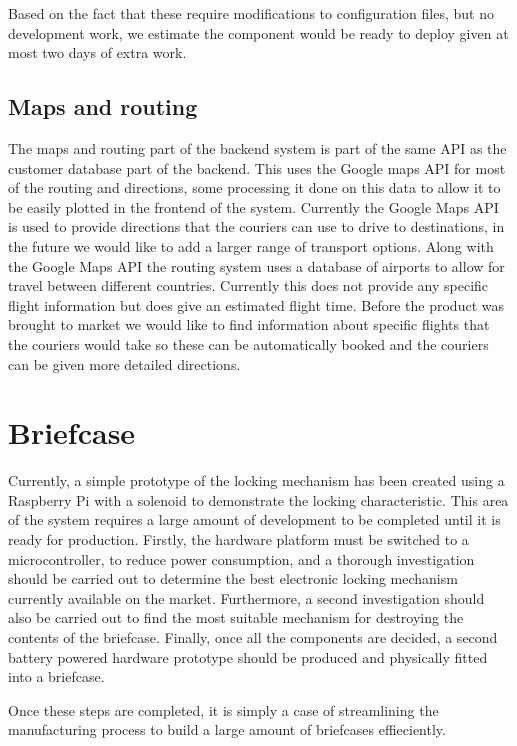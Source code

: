 Based on the fact that these require modifications to configuration files, but no development work, we estimate the component would be ready to deploy given at most two days of extra work.

\subsection{Maps and routing}

The maps and routing part of the backend system is part of the same API as the customer database part of the backend. This uses the Google maps API \cite{MapsAPI} for most of the routing and directions, some processing it done on this data to allow it to be easily plotted in the frontend of the system. Currently the Google Maps API is used to provide directions that the couriers can use to drive to destinations, in the future we would like to add a larger range of transport options. Along with the Google Maps API the routing system uses a database of airports \cite{AirpotFile} to allow for travel between different countries. Currently this does not provide any specific flight information but does give an estimated flight time. Before the product was brought to market we would like to find information about specific flights that the couriers would take so these can be automatically booked and the couriers can be given more detailed directions.

\section{Briefcase}
Currently, a simple prototype of the locking mechanism has been created using a Raspberry Pi \cite{raspberryPi} with a solenoid to demonstrate the locking characteristic. This area of the system requires a large amount of development to be completed until it is ready for production. Firstly, the hardware platform must be switched to a microcontroller, to reduce power consumption, and a thorough investigation should be carried out to determine the best electronic locking mechanism currently available on the market. Furthermore, a second investigation should also be carried out to find the most suitable mechanism for destroying the contents of the briefcase. Finally, once all the components are decided, a second battery powered hardware prototype should be produced and physically fitted into a briefcase.

Once these steps are completed, it is simply a case of streamlining the manufacturing process to build a large amount of briefcases effieciently.
